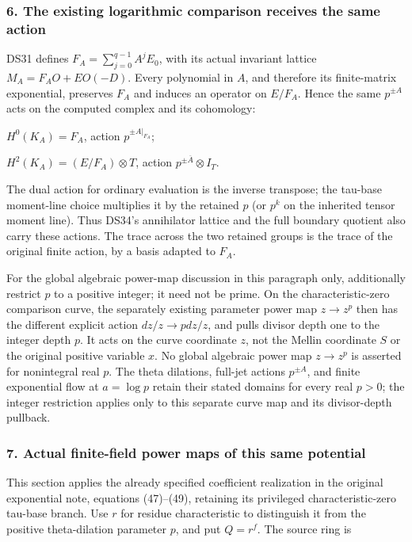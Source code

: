 \subsubsection{6. The existing logarithmic comparison receives the same action}\label{endpoint-f1_scaling--the-existing-logarithmic-comparison-receives-the-same-action}

DS31 defines \(F_A=\sum_{j=0}^{q-1}A^j E_0\), with its actual invariant lattice \(M_A=F_A O+E O(-D)\). Every polynomial in \(A\), and therefore its finite-matrix exponential, preserves \(F_A\) and induces an operator on \(E/F_A\). Hence the same \(p^{\pm A}\) acts on the computed complex and its cohomology:

\(H^0(K_A)=F_A\), action \(p^{\pm\left.A\right|_{F_A}}\);

\(H^2(K_A)=(E/F_A) \otimes T\), action \(p^{\pm\overline A}\otimes I_T\).

The dual action for ordinary evaluation is the inverse transpose; the tau-base moment-line choice multiplies it by the retained \(p\) (or \(p^k\) on the inherited tensor moment line). Thus DS34's annihilator lattice and the full boundary quotient also carry these actions. The trace across the two retained groups is the trace of the original finite action, by a basis adapted to \(F_A\).

For the global algebraic power-map discussion in this paragraph only, additionally restrict \(p\) to a positive integer; it need not be prime. On the characteristic-zero comparison curve, the separately existing parameter power map \(z\to z^p\) then has the different explicit action \(dz/z \to  p dz/z\), and pulls divisor depth one to the integer depth \(p\). It acts on the curve coordinate \(z\), not the Mellin coordinate \(S\) or the original positive variable \(x\). No global algebraic power map \(z\to z^p\) is asserted for nonintegral real \(p\). The theta dilations, full-jet actions \(p^{\pm A}\), and finite exponential flow at \(a=\log p\) retain their stated domains for every real \(p>0\); the integer restriction applies only to this separate curve map and its divisor-depth pullback.

\subsubsection{7. Actual finite-field power maps of this same potential}\label{endpoint-f1_scaling--actual-finite-field-power-maps-of-this-same-potential}

This section applies the already specified coefficient realization in the original exponential note, equations (47)--(49), retaining its privileged characteristic-zero tau-base branch. Use \(r\) for residue characteristic to distinguish it from the positive theta-dilation parameter \(p\), and put \(Q=r^f\). The source ring is

